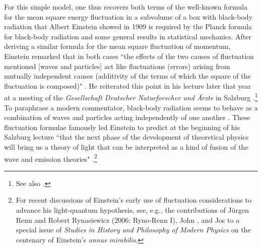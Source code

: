 \documentclass{elsart}
\begin{document}
For this simple model, one thus recovers both terms of the well-known formula for the mean square energy fluctuation in a subvolume of a box with black-body radiation that Albert Einstein showed in 1909 is required by the Planck formula for black-body radiation and some general results in statistical mechanics. After deriving a similar formula for the mean square fluctuation of momentum, Einstein remarked that in both cases ``the effects of the two causes of fluctuation mentioned [waves and particles]  act like fluctuations (errors) arising from mutually independent causes (additivity of the terms of which the square of the fluctuation is composed)" \citep[p.\ 190]{Einstein 1909a}. He  reiterated this point in his lecture later that year at a meeting of the {\it Gesellschaft Deutscher Naturforscher und \"Arzte} in Salzburg \citep[p.\ 498]{Einstein 1909b}.\footnote{See also \citep[p.\ 346]{Einstein 1914}.} To paraphrase a modern commentator, black-body radiation seems to behave as a combination of waves and particles acting independently of one another \citep[p. 178]{Bach 1989}. These fluctuation formulae famously led Einstein to predict at the beginning of his Salzburg lecture ``that the next phase of the development of theoretical physics will bring us a theory of light that can be interpreted as a kind of fusion of the wave and emission theories" \citep[pp.\ 482--483]{Einstein 1909b}.\footnote{For recent discussions of Einstein's early use of fluctuation considerations to advance his light-quantum hypothesis, see, e.g., the contributions of  J\"urgen Renn and Robert Rynasiewicz (2006: Ryno-Renn I), John \citet{Norton 2006}, and Jos \citet{Uffink 2006} to a special issue of {\it Studies in History and Philosophy of Modern Physics} on the centenary of Einstein's {\it annus mirabilis}.}  
\end{document}
